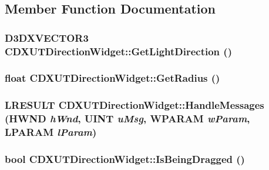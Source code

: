 \subsection{Member Function Documentation}
\hypertarget{class_c_d_x_u_t_direction_widget_ad9b37b2fd57967a6284cb56abe1c5e3a}{
\subsubsection[{GetLightDirection}]{\setlength{\rightskip}{0pt plus 5cm}D3DXVECTOR3 CDXUTDirectionWidget::GetLightDirection ()}}
\label{class_c_d_x_u_t_direction_widget_ad9b37b2fd57967a6284cb56abe1c5e3a}
\hypertarget{class_c_d_x_u_t_direction_widget_a6d6a395df8932ae372b2f7eea3b17f00}{
\subsubsection[{GetRadius}]{\setlength{\rightskip}{0pt plus 5cm}float CDXUTDirectionWidget::GetRadius ()}}
\label{class_c_d_x_u_t_direction_widget_a6d6a395df8932ae372b2f7eea3b17f00}
\hypertarget{class_c_d_x_u_t_direction_widget_aa31062654d6963e8c763626b2413e2c4}{
\subsubsection[{HandleMessages}]{\setlength{\rightskip}{0pt plus 5cm}LRESULT CDXUTDirectionWidget::HandleMessages (HWND {\em hWnd}, \/  UINT {\em uMsg}, \/  WPARAM {\em wParam}, \/  LPARAM {\em lParam})}}
\label{class_c_d_x_u_t_direction_widget_aa31062654d6963e8c763626b2413e2c4}
\hypertarget{class_c_d_x_u_t_direction_widget_a9705e4cdb115b728a6a87d3d535ec64c}{
\subsubsection[{IsBeingDragged}]{\setlength{\rightskip}{0pt plus 5cm}bool CDXUTDirectionWidget::IsBeingDragged ()}}

